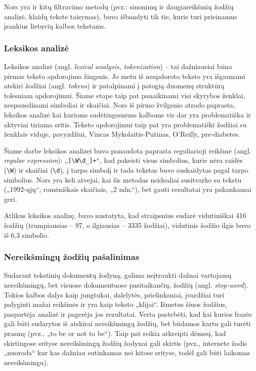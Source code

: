 \documentclass{VUMIFInfBakalaurinis}
\begin{document}
Nors yra ir kitų filtravimo metodų (pvz.: sinonimų ir daugiareikšmių
žodžių analizė, klaidų tekste taisymas), buvo išbandyti tik tie, kurie
turi prieinamus įrankius lietuvių kalbos tekstams.

\subsubsection{Leksikos analizė}

Leksikos analizė (angl. \emph{lexical analysis, tokenization}) -- tai
dažniausiai būna pirmas teksto apdorojimo žingsnis. Jo metu iš
neapdoroto teksto yra išgaunami atskiri žodžiai (angl. \emph{tokens}) ir
patalpinami į patogią duomenų struktūrą tolesniam apdorojimui. Šiame
etape taip pat panaikinami visi skyrybos ženklai, nespausdinami
simboliai ir skaičiai. Nors iš pirmo žvilgsnio atrodo paprasta, leksikos
analizė kai kurioms sudėtingesnėms kalboms vis dar yra problematiška ir
aktyviai tiriama sritis. Teksto apdorojimui taip pat yra problematiški
žodžiai su ženklais viduje, pavyzdžiui, Vincas
Mykolaitis-Putinas, O'Reilly, pre-diabetes.

Šiame darbe leksikos analizei buvo panaudota paprasta reguliarioji
reikšmė (angl. \emph{regular expression}):
„\texttt{{[}\textbackslash W\textbackslash d\_{]}+}“, kad pakeisti visus
simbolius, kurie nėra raidės (\texttt{\textbackslash W}) ir skaičiai
(\texttt{\textbackslash d}), į tarpo simbolį ir tada tekstas buvo suskaidytas
pagal tarpo simbolius. Nors yra keli atvejai, kai šis metodas neidealiai
susitvarko su tekstu („1992-ųjų“, romėniškais skaičiais, „2 mln.“),
bet gauti rezultatai yra pakankamai geri.

Atlikus leksikos analizę, buvo nustatyta, kad straipsnius sudarė
vidutiniškai 416 žodžių (trumpiausias -- 97, o ilgiausias -- 3335
žodžiai), vidutinis žodžio ilgis buvo iš 6,3 simbolio.

\subsubsection{Nereikšmingų žodžių pašalinimas}

Sudarant tekstinių dokumentų žodyną, galima neįtraukti dažnai vartojamų
nereikšmingų, bet visuose dokumentuose pasitaikančių, žodžių (angl.
\emph{stop-word}). Tokios kalbos dalys kaip jungtukai, dalelytės,
prielinksniai, įvardžiai turi palyginti mažai reikšmės ir yra kaip
teksto „klijai“. Išmetus šiuos žodžius, paspartėja analizė ir pagerėja
jos rezultatai. Verta pastebėti, kad kai kurios frazės gali būti
sudarytos iš atskirai nereikšmingų žodžių, bet būdamos kartu gali turėti
prasmę (pvz., „to be or not to be“). Taip pat reikia atkreipti dėmesį,
kad skirtingose srityse nereikšmingų žodžių žodynai gali skirtis (pvz.,
internete žodis „nuoroda“ kur kas dažniau sutinkamas nei kitose srityse, 
todėl gali būti laikomas nereikšmingu).
\end{document}
